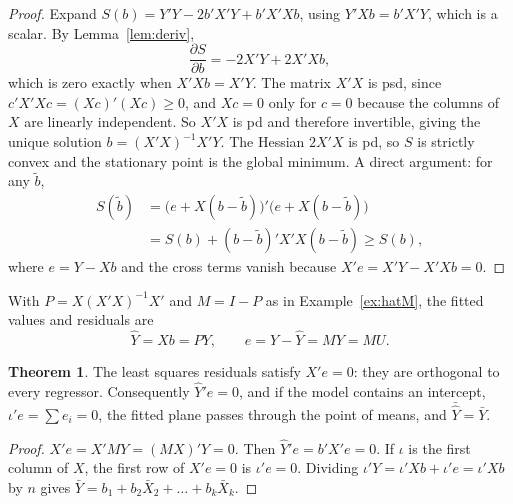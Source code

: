 \documentclass[11pt,a4paper]{article}
\numberwithin{equation}{section}
\theoremstyle{definition}
\newtheorem{thm}{Theorem}[subsection]
\begin{document}
\begin{proof}
Expand $S(b) = Y'Y - 2b'X'Y + b'X'Xb$, using $Y'Xb = b'X'Y$, which is a scalar. By Lemma~\ref{lem:deriv},
\[
\frac{\partial S}{\partial b} = -2X'Y + 2X'Xb ,
\]
which is zero exactly when $X'Xb = X'Y$. The matrix $X'X$ is psd, since $c'X'Xc = (Xc)'(Xc) \geq 0$, and $Xc = 0$ only for $c = 0$ because the columns of $X$
are linearly independent. So $X'X$ is pd and therefore invertible, giving the unique solution $b = (X'X)^{-1}X'Y$. The Hessian $2X'X$ is pd, so $S$ is
strictly convex and the stationary point is the global minimum. A direct argument: for any $\tilde b$,
\begin{align*}
S(\tilde b) &= \bigl(e + X(b - \tilde b)\bigr)'\bigl(e + X(b - \tilde b)\bigr)\\
&= S(b) + (b - \tilde b)'X'X(b - \tilde b) \geq S(b) ,
\end{align*}
where $e = Y - Xb$ and the cross terms vanish because $X'e = X'Y - X'Xb = 0$.
\end{proof}

With $P = X(X'X)^{-1}X'$ and $M = I - P$ as in Example~\ref{ex:hatM}, the fitted values and residuals are
\[
\hat Y = Xb = PY, \qquad e = Y - \hat Y = MY = MU .
\]

\begin{thm}
\label{thm:residk}
The least squares residuals satisfy $X'e = 0$: they are orthogonal to every regressor. Consequently $\hat Y'e = 0$, and if the model contains an
intercept, $\iota'e = \sum e_i = 0$, the fitted plane passes through the point of means, and $\bar{\hat Y} = \bar Y$.
\end{thm}

\begin{proof}
$X'e = X'MY = (MX)'Y = 0$. Then $\hat Y'e = b'X'e = 0$. If $\iota$ is the first column of $X$, the first row of $X'e = 0$ is $\iota'e = 0$. Dividing
$\iota'Y = \iota'Xb + \iota'e = \iota'Xb$ by $n$ gives $\bar Y = b_1 + b_2\bar X_2 + \dots + b_k\bar X_k$.
\end{proof}
\end{document}
